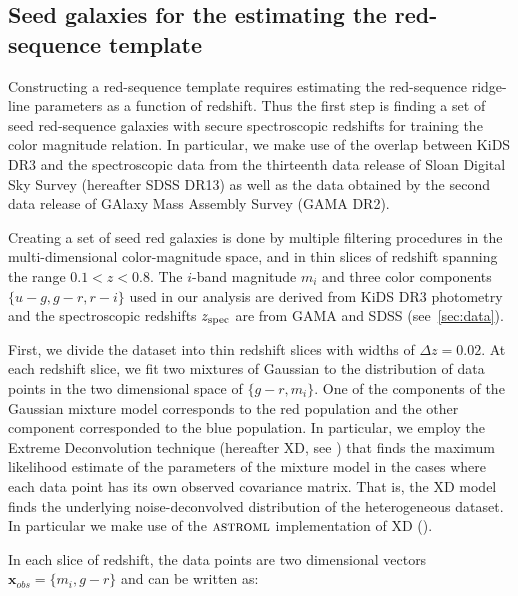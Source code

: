 \documentclass[fleqn,usenatbib]{mnras}
\begin{document}
\subsection{Seed galaxies for the estimating the red-sequence template}
\label{sec:seed}
Constructing a red-sequence template requires estimating the red-sequence ridge-line parameters as a function of redshift. Thus the first step is finding a set of seed red-sequence galaxies with secure spectroscopic redshifts for training the color magnitude relation. In particular, we make use of the overlap between KiDS DR3 and the spectroscopic data from the thirteenth data release of Sloan Digital Sky Survey (hereafter SDSS DR13) as well as the data obtained by the second data release of GAlaxy Mass Assembly Survey (GAMA DR2). 

Creating a set of seed red galaxies is done by multiple filtering procedures in the multi-dimensional color-magnitude space, and in thin slices of redshift spanning the range $0.1<z<0.8$. The $i$-band magnitude $m_i$ and three color components $\{u-g,g-r,r-i\}$ used in our analysis are derived from  KiDS DR3 photometry and the spectroscopic redshifts $z_{\rm spec}$ are from GAMA and SDSS (see~\cref{sec:data}). 

First, we divide the dataset into thin redshift slices with widths of $\Delta z = 0.02$. At each redshift slice, we fit two mixtures of Gaussian to the distribution of data points in the two dimensional space of $\{g-r,m_i\}$. One of the components of the Gaussian mixture model corresponds to the red population and the other component corresponded to the blue population. In particular, we employ the Extreme Deconvolution technique (hereafter XD, see \citealt{xd_code,xd_paper}) that finds the maximum likelihood estimate of the parameters of the mixture model in the cases where each data point has its own observed covariance matrix. That is, the XD model finds the underlying noise-deconvolved distribution of the heterogeneous dataset. In particular we make use of the $\textsc{astroml}$ implementation of XD (\citealt{astroml}).

In each slice of redshift, the data points are two dimensional vectors $\mathbf{x}_{obs} = \{m_i,g-r\}$ 
and can be written as:
\end{document}

